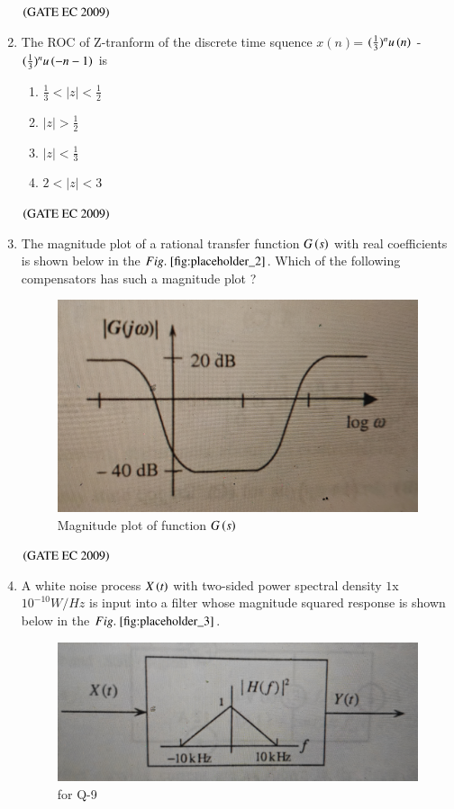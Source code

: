 \documentclass[journal,12pt,onecolumn]{IEEEtran}
\theoremstyle{remark}
\begin{document}
\begin{enumerate}[start=1, label={Q\arabic*.}]
\begin{enumerate}
\end{enumerate}
\hfill $\left(\text{GATE EC 2009}\right)$

\item The ROC of Z-tranform of the discrete time squence $x(n)$= $(\frac{1}{3})^nu\left(n\right)$ - $(\frac{1}{3})^n u\left(-n-1\right)$ is 

\begin{enumerate}
\item $\frac{1}{3} <|z| <\frac{1}{2}$
\item $|z| >\frac{1}{2}$
\item $|z| <\frac{1}{3}$
\item $2<|z|<3$
\end{enumerate}
\hfill $\left(\text{GATE EC 2009}\right)$

\item The magnitude plot of a rational transfer function $G\left(s\right)$ with real coefficients is shown below in the $\figref{fig:placeholder_2}$. Which of the following compensators has such a magnitude plot ?

\begin{figure}[H]
    \centering
    \includegraphics[width=0.5\columnwidth]{figs/img_2.jpg}
    \caption{\centering Magnitude plot of function $G\left(s\right)$ }
    \label{fig:placeholder_2}
\end{figure}


\begin{enumerate}
\end{enumerate}
\hfill $\left(\text{GATE EC 2009}\right)$
\item A white noise process $X\left(t\right)$ with two-sided power spectral density $1$x $10^{-10} W/Hz$ is input into a filter whose magnitude squared response is shown below in the $\figref{fig:placeholder_3}$.
\begin{figure}[H]
    \centering
    \includegraphics[width=0.5\columnwidth]{figs/img_3.jpg}
    \caption{\centering for Q-9}
    \label{fig:placeholder_3}
\end{figure}


\end{enumerate}
\end{document}
